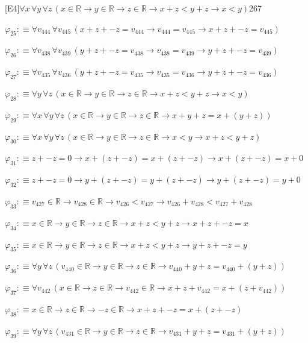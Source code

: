 \begin{fullproof}{[E4]}{$\forall x\,\forall y\,\forall z\,(x \in \mathbb{R} \to y \in \mathbb{R} \to z \in \mathbb{R} \to x + z < y + z \to x < y)$}{267}
\begin{abbrevlist}
\item $\varphi_{25} :\equiv \forall v_{444}\,\forall v_{445}\,(x + z + -z = v_{444} \to v_{444} = v_{445} \to x + z + -z = v_{445})$
\item $\varphi_{26} :\equiv \forall v_{438}\,\forall v_{439}\,(y + z + -z = v_{438} \to v_{438} = v_{439} \to y + z + -z = v_{439})$
\item $\varphi_{27} :\equiv \forall v_{435}\,\forall v_{436}\,(y + z + -z = v_{435} \to v_{435} = v_{436} \to y + z + -z = v_{436})$
\item $\varphi_{28} :\equiv \forall y\,\forall z\,(x \in \mathbb{R} \to y \in \mathbb{R} \to z \in \mathbb{R} \to x + z < y + z \to x < y)$
\item $\varphi_{29} :\equiv \forall x\,\forall y\,\forall z\,(x \in \mathbb{R} \to y \in \mathbb{R} \to z \in \mathbb{R} \to x + y + z = x + (y + z))$
\item $\varphi_{30} :\equiv \forall x\,\forall y\,\forall z\,(x \in \mathbb{R} \to y \in \mathbb{R} \to z \in \mathbb{R} \to x < y \to x + z < y + z)$
\item $\varphi_{31} :\equiv z + -z = 0 \to x + (z + -z) = x + (z + -z) \to x + (z + -z) = x + 0$
\item $\varphi_{32} :\equiv z + -z = 0 \to y + (z + -z) = y + (z + -z) \to y + (z + -z) = y + 0$
\item $\varphi_{33} :\equiv v_{427} \in \mathbb{R} \to v_{428} \in \mathbb{R} \to v_{426} < v_{427} \to v_{426} + v_{428} < v_{427} + v_{428}$
\item $\varphi_{34} :\equiv x \in \mathbb{R} \to y \in \mathbb{R} \to z \in \mathbb{R} \to x + z < y + z \to x + z + -z = x$
\item $\varphi_{35} :\equiv x \in \mathbb{R} \to y \in \mathbb{R} \to z \in \mathbb{R} \to x + z < y + z \to y + z + -z = y$
\item $\varphi_{36} :\equiv \forall y\,\forall z\,(v_{440} \in \mathbb{R} \to y \in \mathbb{R} \to z \in \mathbb{R} \to v_{440} + y + z = v_{440} + (y + z))$
\item $\varphi_{37} :\equiv \forall v_{442}\,(x \in \mathbb{R} \to z \in \mathbb{R} \to v_{442} \in \mathbb{R} \to x + z + v_{442} = x + (z + v_{442}))$
\item $\varphi_{38} :\equiv x \in \mathbb{R} \to z \in \mathbb{R} \to -z \in \mathbb{R} \to x + z + -z = x + (z + -z)$
\item $\varphi_{39} :\equiv \forall y\,\forall z\,(v_{431} \in \mathbb{R} \to y \in \mathbb{R} \to z \in \mathbb{R} \to v_{431} + y + z = v_{431} + (y + z))$

\end{abbrevlist}
\end{fullproof}
